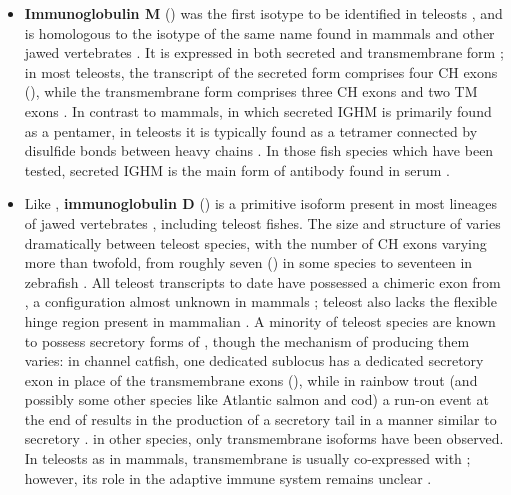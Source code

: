 \begin{itemize}
\item \textbf{Immunoglobulin M} () was the first \igh{} isotype to be identified in teleosts \parencite{fillatreau2013astonishing}, and is homologous to the isotype of the same name found in mammals and other jawed vertebrates \parencite{mashoof2016immunoglobulins}. It is expressed in both secreted and transmembrane form \parencite{fillatreau2013astonishing}; in most teleosts, the transcript of the secreted form comprises four CH exons (), while the transmembrane form comprises three CH exons and two TM exons \parencite{bengten2015fishantibodies,fillatreau2013astonishing}. In contrast to mammals, in which secreted IGHM is primarily found as a pentamer, in teleosts it is typically found as a tetramer \parencite{fillatreau2013astonishing} connected by disulfide bonds between heavy chains \parencite{mashoof2016immunoglobulins}. In those fish species which have been tested, secreted IGHM is the main form of antibody found in serum \parencite{bengten2015fishantibodies,mashoof2016immunoglobulins,fillatreau2013astonishing}.

\item Like , \textbf{immunoglobulin D} () is a primitive isoform present in most lineages of jawed vertebrates \parencite{mashoof2016immunoglobulins}, including teleost fishes. The size and structure of  varies dramatically between teleost species, with the number of CH exons varying more than twofold, from roughly seven () in some species to seventeen in zebrafish \parencite{mashoof2016immunoglobulins,fillatreau2013astonishing}. All teleost  transcripts to date have possessed a chimeric  exon from , a configuration almost unknown in mammals \parencite{mashoof2016immunoglobulins,fillatreau2013astonishing}; teleost  also lacks the flexible hinge region present in mammalian  \parencite{fillatreau2013astonishing}. A minority of teleost species are known to possess secretory forms of , though the mechanism of producing them varies: in channel catfish, one dedicated sublocus has a dedicated  secretory exon in place of the transmembrane exons \parencite{bengten2006catfish} (), while in rainbow trout (and possibly some other species like Atlantic salmon and cod) a run-on event at the end of  results in the production of a secretory tail in a manner similar to secretory  \parencite{ramirezgomez2012secretoryigd}. in other species, only transmembrane isoforms have been observed. In teleosts as in mammals, transmembrane  is usually co-expressed with ; however, its role in the adaptive immune system remains unclear \parencite{mashoof2016immunoglobulins}.


\end{itemize}
